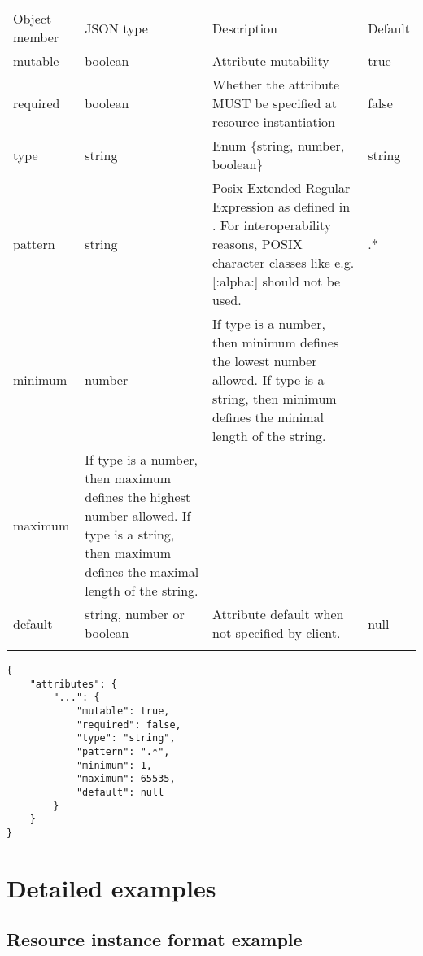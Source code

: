 \documentclass[10pt,a4paper]{article}
\begin{document}
 {
    \begin{tabular}{llll}
    \toprule
    Object member & JSON type & Description & Default \\
    \colrule
    mutable & boolean & Attribute mutability & true \\
    required & boolean & Whether the attribute MUST be specified at resource instantiation & false \\
    type & string & Enum \{string, number, boolean\}
    & string \\
    pattern & string & Posix Extended Regular Expression as defined in \cite{iso9945:2009}. For interoperability reasons, POSIX character classes like e.g. [:alpha:] should not be used. & .* \\
    minimum & number & If type is a number, then minimum defines the lowest number allowed. If type is a string, then minimum defines the minimal length of the string. \\
    maximum & If type is a number, then maximum defines the highest number allowed. If type is a string, then maximum defines the maximal length of the string.\\
    default & string, number or boolean & Attribute default when not specified by client. & null \\
    \botrule
    \end{tabular}
}
\begin{verbatim}
{
    "attributes": {
        "...": {
            "mutable": true,
            "required": false,
            "type": "string",
            "pattern": ".*",
            "minimum": 1,
            "maximum": 65535,
            "default": null
        }
    }
}
\end{verbatim}

\section{Detailed examples}
\label{sec:examples}

\subsection{Resource instance format example}
\label{sec:example_resource}
\end{document}
